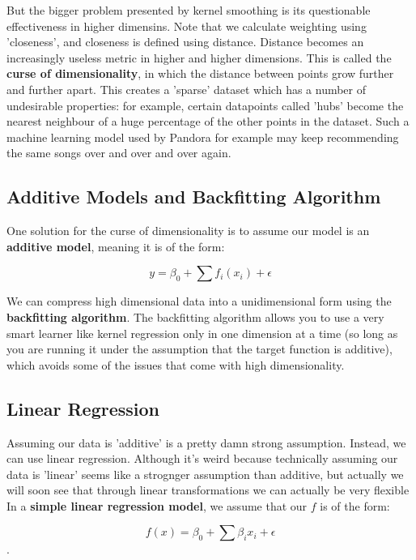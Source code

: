 \documentclass[12pt]{article}
\begin{document}
But the bigger problem presented by kernel smoothing is its questionable effectiveness in higher dimensins. Note that we calculate weighting using 'closeness', and closeness is defined using distance. Distance becomes an increasingly useless metric in higher and higher dimensions. This is called the \textbf{curse of dimensionality}, in which the distance between points grow further and further apart. This creates a 'sparse' dataset which has a number of undesirable properties: for example, certain datapoints called 'hubs' become the nearest neighbour of a huge percentage of the other points in the dataset. Such a machine learning model used by Pandora for example may keep recommending the same songs over and over and over again. \\


\subsection{Additive Models and Backfitting Algorithm}

One solution for the curse of dimensionality is to assume our model is an \textbf{additive model}, meaning it is of the form:

$$ y = \beta_0 + \sum f_i(x_i) + \epsilon$$ 

We can compress high dimensional data into a unidimensional form using the \textbf{backfitting algorithm}. The backfitting algorithm allows you to use a very smart learner like kernel regression only in one dimension at a time (so long as you are running it under the assumption that the target function is additive), which avoids some of the issues that come with high dimensionality.  


\subsection{Linear Regression}

Assuming our data is 'additive' is a pretty damn strong assumption. Instead, we can use linear regression. Although it's weird because technically assuming our data is 'linear' seems like a strognger assumption than additive, but actually we will soon see that through linear transformations we can actually be very flexible\\

In a \textbf{simple linear regression model}, we assume that our $f$ is of the form:

$$f(x) = \beta_0 + \sum \beta_i x_i + \epsilon$$.  \
\end{document}
